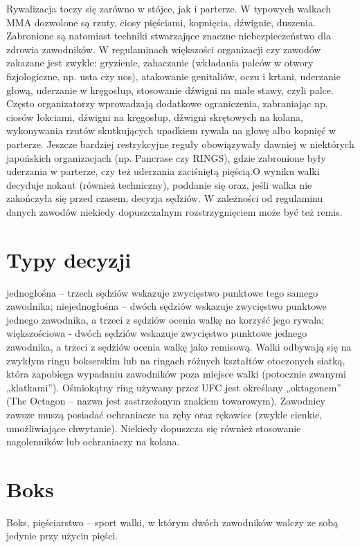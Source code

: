 \documentclass[14pt,oneside,a4paper]{book}
\theoremstyle{break}
\begin{document}
Rywalizacja toczy się zarówno w stójce, jak i parterze. W typowych walkach MMA dozwolone są rzuty, ciosy pięściami, kopnięcia, dźwignie, duszenia. Zabronione są natomiast techniki stwarzające znaczne niebezpieczeństwo dla zdrowia zawodników. W regulaminach większości organizacji czy zawodów zakazane jest zwykle: gryzienie, zahaczanie (wkładania palców w otwory fizjologiczne, np. usta czy nos), atakowanie genitaliów, oczu i krtani, uderzanie głową, uderzanie w kręgosłup, stosowanie dźwigni na małe stawy, czyli palce. Często organizatorzy wprowadzają dodatkowe ograniczenia, zabraniając np. ciosów łokciami, dźwigni na kręgosłup, dźwigni skrętowych na kolana, wykonywania rzutów skutkujących upadkiem rywala na głowę albo kopnięć w parterze. Jeszcze bardziej restrykcyjne reguły obowiązywały dawniej w niektórych japońskich organizacjach (np. Pancrase czy RINGS), gdzie zabronione były uderzania w parterze, czy też uderzania zaciśniętą pięścią.O wyniku walki decyduje nokaut (również techniczny), poddanie się oraz, jeśli walka nie zakończyła się przed czasem, decyzja sędziów. W zależności od regulaminu danych zawodów niekiedy dopuszczalnym rozstrzygnięciem może być też remis.

\section {Typy decyzji}

jednogłośna – trzech sędziów wskazuje zwycięstwo punktowe tego samego zawodnika;
niejednogłośna – dwóch sędziów wskazuje zwycięstwo punktowe jednego zawodnika, a trzeci z sędziów ocenia walkę na korzyść jego rywala;
większościowa - dwóch sędziów wskazuje zwycięstwo punktowe jednego zawodnika, a trzeci z sędziów ocenia walkę jako remisową.
Walki odbywają się na zwykłym ringu bokserskim lub na ringach różnych kształtów otoczonych siatką, która zapobiega wypadaniu zawodników poza miejsce walki (potocznie zwanymi „klatkami”). Ośmiokątny ring używany przez UFC jest określany „oktagonem” (The Octagon – nazwa jest zastrzeżonym znakiem towarowym).
Zawodnicy zawsze muszą posiadać ochraniacze na zęby oraz rękawice (zwykle cienkie, umożliwiające chwytanie). Niekiedy dopuszcza się również stosowanie nagolenników lub ochraniaczy na kolana.

\section {Boks}

 Boks, pięściarstwo – sport walki, w którym dwóch zawodników walczy ze sobą jedynie przy użyciu pięści.
\end{document}
